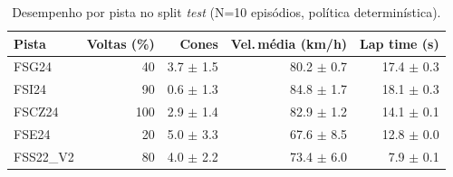\begin{table}[H]
\centering
\caption{Desempenho por pista no split \textit{test} (N=10 episódios, política determinística).}
\label{tab:per_track_test}
\begin{tabular}{lrrrr}
\toprule
\textbf{Pista} & \textbf{Voltas (\%)} & \textbf{Cones} & \textbf{Vel.\,m\'edia (km/h)} & \textbf{Lap time (s)} \\
\midrule
FSG24 & 40 & 3.7 $\pm$ 1.5 & 80.2 $\pm$ 0.7 & 17.4 $\pm$ 0.3 \\
FSI24 & 90 & 0.6 $\pm$ 1.3 & 84.8 $\pm$ 1.7 & 18.1 $\pm$ 0.3 \\
FSCZ24 & 100 & 2.9 $\pm$ 1.4 & 82.9 $\pm$ 1.2 & 14.1 $\pm$ 0.1 \\
FSE24 & 20 & 5.0 $\pm$ 3.3 & 67.6 $\pm$ 8.5 & 12.8 $\pm$ 0.0 \\
FSS22_V2 & 80 & 4.0 $\pm$ 2.2 & 73.4 $\pm$ 6.0 & 7.9 $\pm$ 0.1 \\
\bottomrule
\end{tabular}
\end{table}
